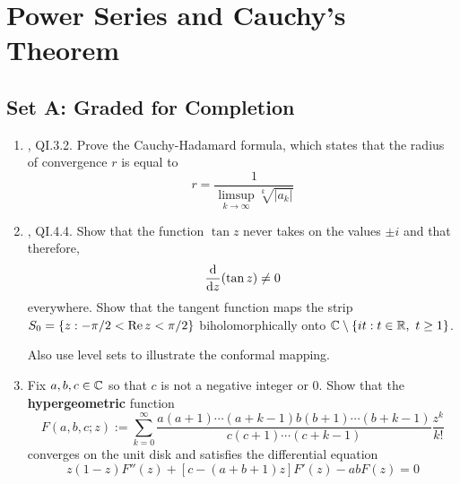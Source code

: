 \documentclass[../psets.tex]{subfiles}
\begin{document}
\section{Power Series and Cauchy's Theorem}
\subsection*{Set A: Graded for Completion}
\begin{enumerate}[ref={A.\arabic*}]
    \item {}\textcite{bib:FischerLieb}, QI.3.2. Prove the Cauchy-Hadamard formula, which states that the radius of convergence $r$ is equal to
    \begin{equation*}
        r = \frac{1}{\limsup_{k\to\infty}\sqrt[k]{|a_k|}}
    \end{equation*}
    \item \textcite{bib:FischerLieb}, QI.4.4. Show that the function $\tan z$ never takes on the values $\pm i$ and that therefore,
    \begin{equation*}
        \dv{z}(\tan z) \neq 0
    \end{equation*}
    everywhere. Show that the tangent function maps the strip $S_0=\{z:-\pi/2<\operatorname{Re} z<\pi/2\}$ biholomorphically onto $\mathbb{C}\setminus\{it:t\in\mathbb{R},\ t\geq 1\}$.\par
    Also use level sets to illustrate the conformal mapping.
    \item Fix $a,b,c\in\mathbb{C}$ so that $c$ is not a negative integer or 0. Show that the \textbf{hypergeometric} function
    \begin{equation*}
        F(a,b,c;z) := \sum_{k=0}^\infty\frac{a(a+1)\cdots(a+k-1)b(b+1)\cdots(b+k-1)}{c(c+1)\cdots(c+k-1)}\frac{z^k}{k!}
    \end{equation*}
    converges on the unit disk and satisfies the differential equation
    \begin{equation*}
        z(1-z)F''(z)+[c-(a+b+1)z]F'(z)-abF(z) = 0
    \end{equation*}
\end{enumerate}
\end{document}
